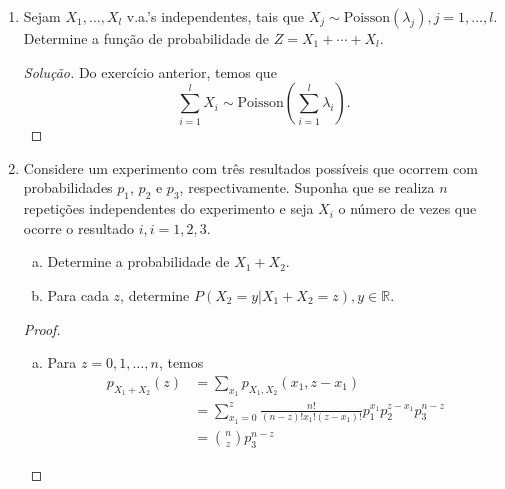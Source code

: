 \documentclass[../Notas.tex]{subfiles}
\begin{document}
\begin{enumerate}
    \begin{proof}[Solução]
        \begin{enumerate}
            \item Foi feito no texto.
            \item Para $z = 2, \dots, N$, temos
            \[
            p_Z(z) = P(X+Y = z) = \sum_{x=1}^{z-1} P(X=x)P(Y=z-x) = \frac{z-1}{N^2}.
            \]
            Para $z = N+1, \dots, 2N$, temos
            \[
            p_Z(z) = P(X+Y = z) = \sum_{x=1}^{2N-z+1} P(X=x)P(Y=z-x) = \frac{2N-z+1}{N^2}.
            \]
            Para $z\notin\{2,3,\dots,2N\}$, $p_Z(z) = 0.$
        \end{enumerate}
    \end{proof}
    \item Sejam $X_1, \dots, X_l$ v.a.’s independentes, tais que $X_j\sim\text{Poisson}(\lambda_j), j=1, \dots, l$. Determine a função de probabilidade de $Z = X_1 + \cdots + X_l$.
    \begin{proof}[Solução]
        Do exercício anterior, temos que
        \[
        \sum_{i=1}^l X_i \sim \text{Poisson}\left( \sum_{i=1}^l \lambda_i \right).
        \]
    \end{proof}
    \item Considere um experimento com três resultados possíveis que ocorrem com probabilidades $p_1$, $p_2$ e $p_3$, respectivamente. Suponha que se realiza $n$ repetições independentes do experimento e seja $X_i$ o número de vezes que ocorre o resultado $i, i =1, 2, 3$.
    \begin{enumerate}[a)]
    \item Determine a probabilidade de $X_1+X_2$.
    \item Para cada $z$, determine $P(X_2=y|X_1+X_2 = z), y\in\mathbb{R}$.
    \end{enumerate}
    \begin{proof}
        \begin{enumerate}[a)]
            \item Para $z=0,1,\dots,n$, temos
            \begin{align*}
                p_{X_1 + X_2}(z) &= \sum_{x_1} p_{X_1, X_2}(x_1, z-x_1) \\
                                 &= \sum_{x_1=0}^{z}
                                 \frac{n!}{(n-z)!x_1!(z-x_1)!}p_1^{x_1}p_2^{z-x_1}p_3^{n-z} \\
                                 &= \binom{n}{z}p_3^{n-z}

\end{align*}
\end{enumerate}
\end{proof}
\end{enumerate}
\end{document}
